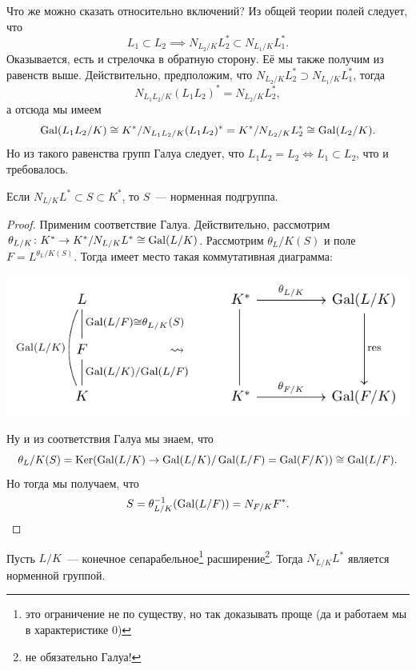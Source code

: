 	Что же можно сказать относительно включений? Из общей теории полей следует, что 
	\[
		L_1 \subset L_2 \implies N_{L_2/K} L_2^* \subset N_{L_1/K}L_1^*.
	\]
	Оказывается, есть и стрелочка в обратную сторону. Её мы также получим из равенств выше. Действительно, предположим, что $N_{L_2/K}L_2^* \supset N_{L_1/K} L_1^*$, тогда 
	\[
		N_{L_1 L_2/K}(L_1 L_2)^* = N_{L_2/K}L_2^*,
	\]
	а отсюда мы имеем 
	\[
		\operatorname{Gal}(L_1 L_2/K) \cong K^*/N_{L_1 L_2/K}(L_1L_2)^* = K^*/N_{L_2/K}L_2^* \cong \operatorname{Gal}(L_2/K).
	\]
	Но из такого равенства групп Галуа следует, что $L_1 L_2 = L_2 \Leftrightarrow L_1 \subset L_2$, что и требовалось.

	\begin{exercise}
		Если $N_{L/K}L^* \subset S \subset K^*$, то $S$~--- норменная подгруппа. 		 
	\end{exercise}
        \begin{proof}
		Применим соответствие Галуа. Действительно, рассмотрим $\theta_{L/K}\colon K^{*} \to K^*/N_{L/K}L^* \cong \operatorname{Gal}(L/K)$. Рассмотрим $\theta_L/K(S)$ и поле $F = L^{\theta_L/K(S)}$. Тогда имеет место такая коммутативная диаграмма: 
		\begin{center}
			\includegraphics{lectures/6/pictures/cd_51.pdf}
		\end{center}
		Ну и из соответствия Галуа мы знаем, что 
		\[
			\theta_L/K(S) = \Ker\lr*{\Gal(L/K) \to \Gal(L/K)/\Gal(L/F) = \Gal(F/K)} \cong \Gal(L/F).
		\]
		Но тогда мы получаем, что 
		\[
			S = \theta_{L/K}^{-1}(\operatorname{Gal}(L/F)) = N_{F/K}F^*. 
		\]
	\end{proof}

	\begin{theorem} 
		Пусть $L/K$~--- конечное сепарабельное\footnote{это ограничение не по существу, но так доказывать проще (да и работаем мы в характеристике 0)} расширение\footnote{не обязательно Галуа!}. Тогда $N_{L/K}L^*$ является норменной группой. 
	\end{theorem}


